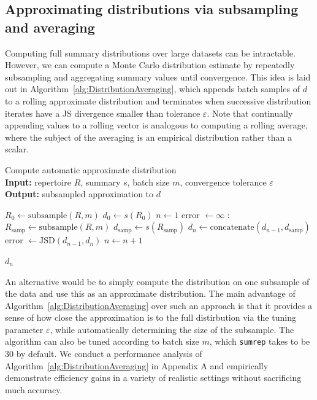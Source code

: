 \documentclass{article}
\begin{document}
\subsection*{Approximating distributions via subsampling and averaging}
Computing full summary distributions over large datasets can be intractable.
However, we can compute a Monte Carlo distribution estimate by repeatedly subsampling and aggregating summary values until convergence.
This idea is laid out in Algorithm~\ref{alg:DistributionAveraging}, which appends batch samples of $d$ to a rolling approximate distribution and terminates when successive distribution iterates have a JS divergence smaller than tolerance $\varepsilon$.
Note that continually appending values to a rolling vector is analogous to computing a rolling average, where the subject of the averaging is an empirical distribution rather than a scalar.
\begin{algorithm}
    \caption{Compute automatic approximate distribution \\
        \textbf{Input:} repertoire $R$, summary $s$, batch size $m$, convergence tolerance $\varepsilon$\\
        \textbf{Output:} subsampled approximation to $d$}
    \label{alg:DistributionAveraging}
    \begin{algorithmic}
        \State $R_0 \gets \text{subsample}(R, m)$
        \State $d_0 \gets s(R_0)$
        \State $n \gets 1$
        \State error $\gets \infty$
        :
        \State $R_\text{samp} \gets \text{subsample}(R, m)$
        \State $d_\text{samp} \gets s(R_\text{samp})$
        \State $d_n \gets \text{concatenate}(d_{n-1}, d_\text{samp})$
        \State error $\gets \text{JSD}(d_{n-1}, d_n)$
        \State $n \gets n + 1$
        \EndWhile
    \end{algorithmic}
    \Return $d_n$
\end{algorithm}

An alternative would be to simply compute the distribution on one subsample of the data and use this as an approximate distribution.
The main advantage of Algorithm~\ref{alg:DistributionAveraging} over such an approach is that it provides a sense of how close the approximation is to the full distirbution via the tuning parameter $\varepsilon$, while automatically determining the size of the subsample.
The algorithm can also be tuned according to batch size $m$, which \texttt{sumrep} takes to be 30 by default.
We conduct a performance analysis of Algorithm~\ref{alg:DistributionAveraging} in Appendix A and empirically demonstrate efficiency gains in a variety of realistic settings without sacrificing much accuracy.
\end{document}
